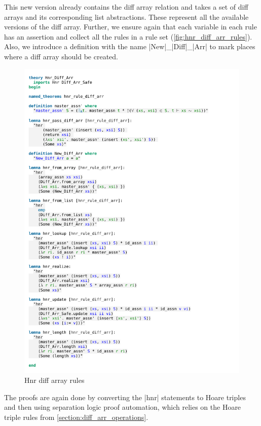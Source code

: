 \noindent This new version already contains the diff array relation and takes a set of diff arrays and its corresponding list abstractions. These represent all the available versions of the diff array. Further, we ensure again that each variable in each rule has an assertion and collect all the rules in a rule set (\autoref{fig:hnr_diff_arr_rules}). Also, we introduce a definition with the name |New|\_|Diff|\_|Arr| to mark places where a diff array should be created.

\begin{figure}[htpb]
    \includegraphics[trim={0 1,2cm 0 4,8cm}, clip, width=1.00\textwidth]{figures/Theory_Hnr_Diff_Arr.pdf}
    \caption[Hnr diff array rules]{Hnr diff array rules}
    \label{fig:hnr_diff_arr_rules}
\end{figure}

\noindent The proofs are again done by converting the |hnr| statements to Hoare triples and then using separation logic proof automation, which relies on the Hoare triple rules from \autoref{section:diff_arr_operations}.

